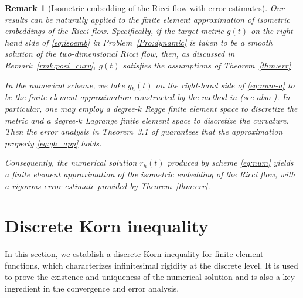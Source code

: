 \documentclass[11pt,a4paper,oneside,reqno]{amsart}
\theoremstyle{definition}
\theoremstyle{plain}
\newtheorem{remark}{Remark}[section]
\numberwithin{theorem}{section}
\numberwithin{proposition}{section}
\numberwithin{lemma}{section}
\numberwithin{equation}{section}
\begin{document}
\begin{remark}[Isometric embedding of the Ricci flow with error estimates]
    \upshape
Our results can be naturally applied to the finite element approximation of isometric embeddings of the Ricci flow.
Specifically, if the target metric \(g(t)\) on the right-hand side of \eqref{eq:isoemb} in Problem~\ref{Pro:dynamic} is taken to be a smooth solution of the two-dimensional Ricci flow, then, as discussed in Remark~\ref{rmk:posi_curv}, \(g(t)\) satisfies the assumptions of Theorem~\ref{thm:err}.

In the numerical scheme, we take \(g_h(t)\) on the right-hand side of \eqref{eq:num-a} to be the finite element approximation constructed by the method in \cite[Eq.~(3.3)]{gao2025ricci} (see also \cite[Eqs.~(9)--(11)]{gawlik2019finite}). 
In particular, one may employ a degree-\(k\) Regge finite element space to discretize the metric and a degree-\(k\) Lagrange finite element space to discretize the curvature. Then the error analysis in Theorem~3.1 of \cite{gao2025ricci} guarantees that the approximation property \eqref{eq:gh_app} holds. 

Consequently, the numerical solution \(r_h(t)\) produced by scheme \eqref{eq:num} yields a finite element approximation of the isometric embedding of the Ricci flow, with a rigorous error estimate provided by Theorem~\ref{thm:err}.
\end{remark}




\section{Discrete Korn inequality}\label{sec:korn}
In this section, we establish a discrete Korn inequality for finite element functions, which characterizes infinitesimal rigidity at the discrete level.
It is used to prove the existence and uniqueness of the numerical solution and is also a key ingredient in the convergence and error analysis.
 
\end{document}
